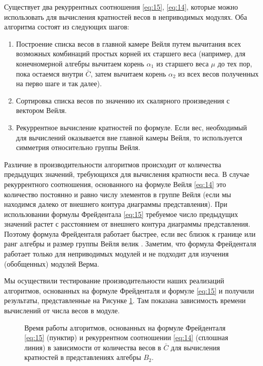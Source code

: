 Существует два рекуррентных соотношения \eqref{eq:15}, \eqref{eq:14}, которые можно использовать для вычисления кратностей весов в неприводимых модулях. Оба алгоритма состоят из следующих шагов:
\begin{enumerate}
\item Построение списка весов в главной камере Вейля путем вычитания всех возможных комбинаций простых корней их старшего веса (например, для конечномерной алгебры вычитаем корень  $\alpha_{1}$ из старшего веса $\mu$ до тех пор, пока остаемся внутри  $\bar C$, затем вычитаем корень $\alpha_{2}$ из всех весов полученных на перво шаге и так далее).
\item Сортировка списка весов по значению их скалярного произведения с вектором Вейля.
\item Рекуррентное вычисление кратностей по формуле. Если вес, необходимый для вычислений оказывается вне главной камеры Вейля, то используется симметрия относительно группы Вейля.
\end{enumerate}
Различие в производительности алгоритмов происходит от количества предыдущих значений, требующихся для вычисления кратности веса. В случае рекуррентного соотношения, основанного на формуле Вейля  \eqref{eq:14} это количество постоянно и равно числу элементов в группе Вейля (если мы находимся далеко от внешнего контура диаграммы представления). При использовании формулы Фрейдентала \eqref{eq:15} требуемое число предыдущих значений растет с расстоянием от внешнего контура диаграммы представления.  Поэтому формула Фрейденталя работает быстрее, если вес близок к границе или ранг алгебры и размер группы Вейля велик \cite{moody1982fast}. Заметим, что формула Фрейденталя работает только для неприводимых модулей и не подходит для изучения (обобщенных) модулей Верма.

Мы осуществили тестирование производительности наших реализаций алгоритмов, основанных на формуле Фрейденталя и формуле \eqref{eq:15} и получили результаты, представленные на Рисунке  \ref{fig:freudenthal-racah-times}. Там показана зависимость времени вычислений от числа весов в модуле.

\begin{figure}[h]
  \noindent{}
  \caption{Время работы алгоритмов, основанных на формуле Фрейденталя \eqref{eq:15} (пунктир) и рекуррентном соотношении \eqref{eq:14} (сплошная линия) в зависимости от количества весов в  $\bar C$ для вычисления кратностей в представлениях алгебры $B_{2}$.}
\label{fig:freudenthal-racah-times}

\end{figure}

